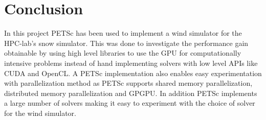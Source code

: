 \chapter{Conclusion}

In this project PETSc has been used to implement a wind simulator for the HPC-lab's
snow simulator. This was done to investigate the performance gain obtainable by
using high level libraries to use the GPU for computationally intensive problems
instead of hand implementing solvers with low level APIs like CUDA and OpenCL.
A PETSc implementation also enables easy experimentation with parallelization
method as PETSc supports shared memory parallelization, distributed memory
parallelization and GPGPU. In addition PETSc implements a large number of solvers
making it easy to experiment with the choice of solver for the wind simulator.

